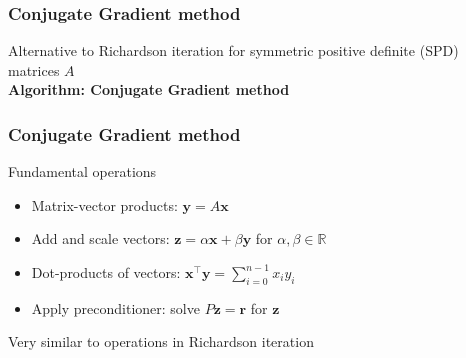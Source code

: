\documentclass{beamer}
\begin{document}
\begin{frame}[fragile]
  \frametitle{Conjugate Gradient method}
Alternative to Richardson iteration for symmetric positive definite (SPD) matrices $A$\\[2ex]
\textbf{Algorithm: Conjugate Gradient method}
\begin{algorithmic}[1]
\EndFor
\end{algorithmic}
\end{frame}


\begin{frame}[fragile]
  \frametitle{Conjugate Gradient method}
Fundamental operations
\begin{itemize}
  \item Matrix-vector products: $\boldsymbol{y}=A\boldsymbol{x}$
  \item Add and scale vectors: $\boldsymbol{z} = \alpha \boldsymbol{x}+\beta \boldsymbol{y}$ for $\alpha,\beta\in\mathbb{R}$
  \item Dot-products of vectors: $\boldsymbol{x}^\top\boldsymbol{y}=\sum_{i=0}^{n-1} x_i y_i$
  \item Apply preconditioner: solve $P\boldsymbol{z}=\boldsymbol{r}$ for $\boldsymbol{z}$
\end{itemize}
Very similar to operations in Richardson iteration
\end{frame}

\end{document}
